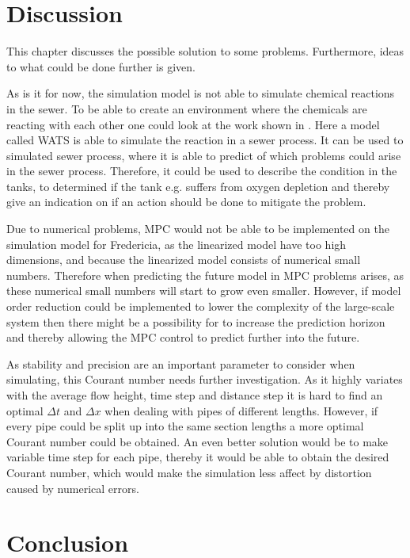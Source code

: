 \chapter{Discussion}\label{ch:discussion}
This chapter discusses the possible solution to some problems. Furthermore, ideas to what could be done further is given. 

As is it for now, the simulation model is not able to simulate chemical reactions in the sewer. To be able to create an environment where the chemicals are reacting with each other one could look at the work shown in \cite{Sewer_processes}. Here a model called WATS is able to simulate the reaction in a sewer process. It can be used to simulated sewer process, where it is able to predict of which problems could arise in the sewer process. Therefore, it could be used to describe the condition in the tanks, to determined if the tank e.g. suffers from oxygen depletion and thereby give an indication on if an action should be done to mitigate the problem.   

Due to numerical problems, MPC would not be able to be implemented on the simulation model for Fredericia, as the linearized model have too high dimensions, and because the linearized model consists of numerical small numbers. Therefore when predicting the future model in MPC problems arises, as these numerical small numbers will start to grow even smaller. However, if model order reduction could be implemented to lower the complexity of the large-scale system then there might be a possibility for to increase the prediction horizon and thereby allowing the MPC control to predict further into the future. 

As stability and precision are an important parameter to consider when simulating, this Courant number needs further investigation. As it highly variates with the average flow height, time step and distance step it is hard to find an optimal $\Delta t$ and $\Delta x$ when dealing with pipes of different lengths. However, if every pipe could be split up into the same section lengths a more optimal Courant number could be obtained. An even better solution would be to make variable time step for each pipe, thereby it would be able to obtain the desired Courant number, which would make the simulation less affect by distortion caused by numerical errors. 

\chapter{Conclusion}\label{ch:conclusion}


